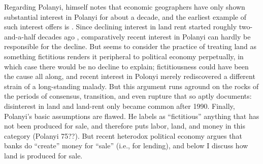 Regarding Polanyi, \citet[134]{christophers2016forreal} himself notes
that economic geographers have only shown substantial interest in
Polanyi for about a decade, and the earliest example of such interest
\citeauthor{christophers2016forreal} offers is \citet{prudham2012knockon}.
Since declining interest in land rent started roughly two-and-a-half
decades ago \citep{park2014landrent,ward2016theshitty}, comparatively
recent interest in Polanyi can hardly be responsible for the decline.
But \citet{christophers2016forreal}seems to consider the practice
of treating land as something fictitious renders it peripheral to
political economy perpetually, in which case there would be no decline
to explain; fictitiousness could have been the cause all along, and
recent interest in Polonyi merely rediscovered a different strain
of a long-standing malady. But this argument runs aground on the rocks
of the periods of consensus, transition, and even rupture that \citet{haila1990thetheory}
so aptly documents: disinterest in land and land-rent only became
common after 1990. Finally, Polanyi's basic assumptions are flawed.
He labels as ``fictitious'' anything that has not been produced
for sale, and therefore puts labor, land, and money in this category
(Polanyi 75??). But recent heterodox political economy \citep{bertocco2007thecharacteristics,graziani2003themonetary}
argues that banks do ``create'' money for ``sale'' (i.e., for
lending), and below I discuss how land is produced for sale.

